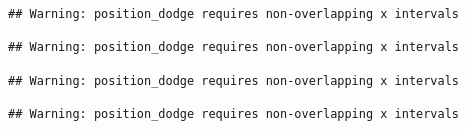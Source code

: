 \documentclass[
]{article}
\newenvironment{Shaded}{\begin{snugshade}}{\end{snugshade}}
\newcommand{\CommentTok}[1]{\textcolor[rgb]{0.56,0.35,0.01}{\textit{#1}}}
\newcommand{\ControlFlowTok}[1]{\textcolor[rgb]{0.13,0.29,0.53}{\textbf{#1}}}
\newcommand{\DataTypeTok}[1]{\textcolor[rgb]{0.13,0.29,0.53}{#1}}
\newcommand{\DecValTok}[1]{\textcolor[rgb]{0.00,0.00,0.81}{#1}}
\newcommand{\NormalTok}[1]{#1}
\newcommand{\OperatorTok}[1]{\textcolor[rgb]{0.81,0.36,0.00}{\textbf{#1}}}
\newcommand{\StringTok}[1]{\textcolor[rgb]{0.31,0.60,0.02}{#1}}
\begin{document}
\begin{verbatim}
## Warning: position_dodge requires non-overlapping x intervals

## Warning: position_dodge requires non-overlapping x intervals

## Warning: position_dodge requires non-overlapping x intervals

## Warning: position_dodge requires non-overlapping x intervals
\end{verbatim}

\begin{Shaded}
\end{Shaded}
\end{document}
